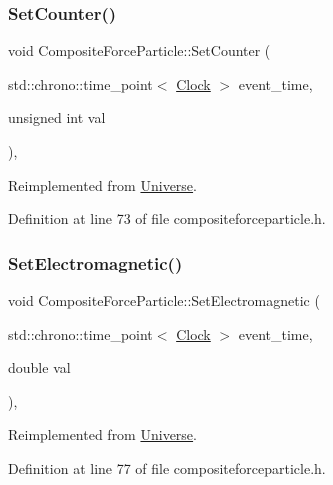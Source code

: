 \subsubsection{\texorpdfstring{Set\+Counter()}{SetCounter()}}
{\footnotesize\ttfamily void Composite\+Force\+Particle\+::\+Set\+Counter (\begin{DoxyParamCaption}\item[{std\+::chrono\+::time\+\_\+point$<$ \hyperlink{universe_8h_a0ef8d951d1ca5ab3cfaf7ab4c7a6fd80}{Clock} $>$}]{event\+\_\+time,  }\item[{unsigned int}]{val }\end{DoxyParamCaption})\hspace{0.3cm}{\ttfamily [inline]}, {\ttfamily [virtual]}}



Reimplemented from \hyperlink{class_universe_aa22202ae740eb1355529afcb13285e91}{Universe}.



Definition at line 73 of file compositeforceparticle.\+h.

\mbox{\label{class_composite_force_particle_a476c0d570c3be75c9e186df1ec2a5cda}} 
\subsubsection{\texorpdfstring{Set\+Electromagnetic()}{SetElectromagnetic()}}
{\footnotesize\ttfamily void Composite\+Force\+Particle\+::\+Set\+Electromagnetic (\begin{DoxyParamCaption}\item[{std\+::chrono\+::time\+\_\+point$<$ \hyperlink{universe_8h_a0ef8d951d1ca5ab3cfaf7ab4c7a6fd80}{Clock} $>$}]{event\+\_\+time,  }\item[{double}]{val }\end{DoxyParamCaption})\hspace{0.3cm}{\ttfamily [inline]}, {\ttfamily [virtual]}}



Reimplemented from \hyperlink{class_universe_aa981fc7e252b1fbbb675f0371860954d}{Universe}.



Definition at line 77 of file compositeforceparticle.\+h.

